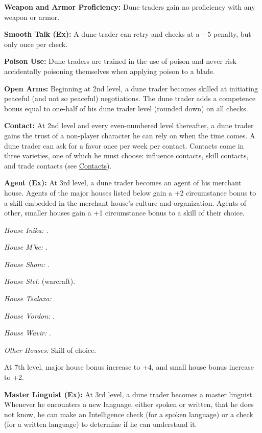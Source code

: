 {
\textbf{Weapon and Armor Proficiency:} Dune traders gain no proficiency with any weapon or armor.

\textbf{Smooth Talk (Ex):} A dune trader can retry  and  checks at a $-5$ penalty, but only once per check.

\textbf{Poison Use:} Dune traders are trained in the use of poison and never risk accidentally poisoning themselves when applying poison to a blade.

\textbf{Open Arms:} Beginning at 2nd level, a dune trader becomes skilled at initiating peaceful (and not so peaceful) negotiations. The dune trader adds a competence bonus equal to one-half of his dune trader level (rounded down) on all  checks.

\textbf{Contact:} At 2nd level and every even-numbered level thereafter, a dune trader gains the trust of a non-player character he can rely on when the time comes. A dune trader can ask for a favor once per week per contact. Contacts come in three varieties, one of which he must choose: influence contacts, skill contacts, and trade contacts (see \hyperref[sec:contacts]{Contacts}).

\textbf{Agent (Ex):} At 3rd level, a dune trader becomes an agent of his merchant house. Agents of the major houses listed below gain a +2 circumstance bonus to a skill embedded in the merchant house's culture and organization. Agents of other, smaller houses gain a +1 circumstance bonus to a skill of their choice.

\textit{House Inika:} .

\textit{House M'ke:} .

\textit{House Shom:} .

\textit{House Stel:}  (warcraft).

\textit{House Tsalaxa:} .

\textit{House Vordon:} .

\textit{House Wavir:} .

\textit{Other Houses:} Skill of choice.

At 7th level, major house bonus increase to +4, and small house bonus increase to +2.

\textbf{Master Linguist (Ex):} At 3rd level, a dune trader becomes a master linguist. Whenever he encounters a new language, either spoken or written, that he does not know, he can make an Intelligence check (for a spoken language) or a  check (for a written language) to determine if he can understand it.

}

